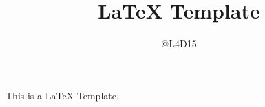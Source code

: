 \documentclass[parskip=half*]{scrartcl}
\title{LaTeX Template}
\author{@L4D15}
\begin{document}
\maketitle

This is a LaTeX Template.
\end{document}
